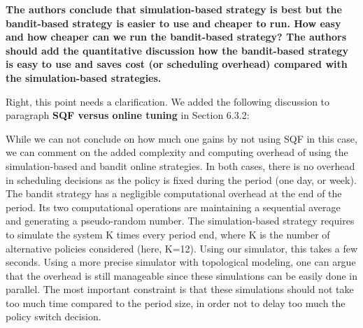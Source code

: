 \documentclass[]{article}
\begin{document}
\medskip

\textbf{The authors conclude that simulation-based strategy is best but the bandit-based strategy is easier to use and cheaper
to run. How easy and how cheaper can we run the bandit-based strategy? The authors should add the quantitative
discussion how the bandit-based strategy is easy to use and saves cost (or scheduling overhead) compared with the
simulation-based strategies.
}

Right, this point needs a clarification. We added the following discussion to paragraph
\textbf{SQF versus online tuning} in Section 6.3.2:

\begin{displayquote}
While we can not conclude on how much one gains by not using SQF in this case,
we can comment on the added complexity and computing overhead of using the
simulation-based and bandit online strategies. In both cases, there is no
overhead in scheduling decisions as the policy is fixed during the period (one
day, or week). The bandit strategy has a negligible computational overhead at
the end of the period. Its two computational operations are maintaining a
sequential average and generating a pseudo-random number.  The simulation-based
strategy requires to simulate the system K times every period end, where K is
the number of alternative policies considered (here, K=12). Using our
simulator, this takes a few seconds. Using a more precise simulator with
topological modeling, one can argue that the overhead is still manageable since
these simulations can be easily done in parallel. The most important constraint
is that these simulations should not take too much time compared to the period
size, in order not to delay too much the policy switch decision.
\end{displayquote}

\medskip



\end{document}
